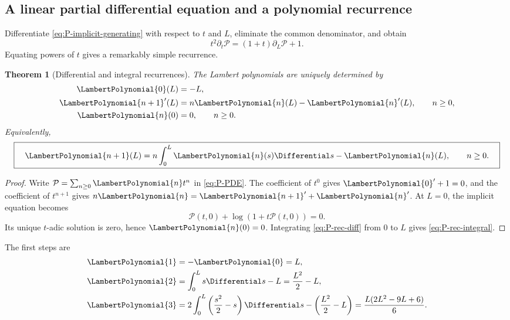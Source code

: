 \documentclass[11pt]{article}
\theoremstyle{pltheorem}
\newtheorem{theorem}{Theorem}[section]
\begin{document}
\subsection{A linear partial differential equation and a polynomial recurrence}

Differentiate \cref{eq:P-implicit-generating} with respect to \(t\) and \(L\), eliminate the common denominator, and obtain
\begin{equation}\label{eq:P-PDE}
 \boxed{\quad
 t^2\partial_t\mathcal P=(1+t)\partial_L\mathcal P+1.
 \quad}
\end{equation}
Equating powers of \(t\) gives a remarkably simple recurrence.

\begin{theorem}[Differential and integral recurrences]\label{thm:P-recurrence}
The Lambert polynomials are uniquely determined by
\begin{align}
 \LambertPolynomial{0}(L)&=-L,\label{eq:P-rec-P0}\\
 \LambertPolynomial{n+1}'(L)&=n\LambertPolynomial{n}(L)-\LambertPolynomial{n}'(L),\qquad n\ge0,
 \label{eq:P-rec-diff}\\
 \LambertPolynomial{n}(0)&=0,\qquad n\ge0.
 \label{eq:P-zero}
\end{align}
Equivalently,
\begin{equation}\label{eq:P-rec-integral}
 \boxed{\quad
 \LambertPolynomial{n+1}(L)=n\int_0^L \LambertPolynomial{n}(s)\Differential s-\LambertPolynomial{n}(L),
 \qquad n\ge0.
 \quad}
\end{equation}
\end{theorem}

\begin{proof}
Write \(\mathcal P=\sum_{n\ge0}\LambertPolynomial{n}t^n\) in \cref{eq:P-PDE}.  The coefficient of \(t^0\) gives \(\LambertPolynomial{0}'+1=0\), and the coefficient of \(t^{n+1}\) gives
\(n\LambertPolynomial{n}=\LambertPolynomial{n+1}'+\LambertPolynomial{n}'\).  At \(L=0\), the implicit equation becomes
\[
 \mathcal P(t,0)+\log(1+t\mathcal P(t,0))=0.
\]
Its unique \(t\)-adic solution is zero, hence \(\LambertPolynomial{n}(0)=0\).  Integrating \cref{eq:P-rec-diff} from \(0\) to \(L\) gives \cref{eq:P-rec-integral}.
\end{proof}

The first steps are
\begin{align*}
 \LambertPolynomial{1}&=-\LambertPolynomial{0}=L,\\
 \LambertPolynomial{2}&=\int_0^L s\Differential s-L=\frac{L^2}{2}-L,\\
 \LambertPolynomial{3}&=2\int_0^L\left(\frac{s^2}{2}-s\right)\Differential s
 -\left(\frac{L^2}{2}-L\right)
 =\frac{L(2L^2-9L+6)}6.
\end{align*}
\end{document}
